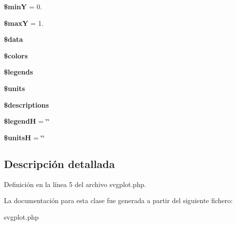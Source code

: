 \begin{DoxyCompactItemize}
\item 
\hypertarget{classSVGplot_a1cf6d7665187cdcff7721f4a41b2590d}{{\bfseries \$min\-Y} = 0.}\label{classSVGplot_a1cf6d7665187cdcff7721f4a41b2590d}

\item 
\hypertarget{classSVGplot_a3e917ac1e30762bb7fc99ed715a36ab7}{{\bfseries \$max\-Y} = 1.}\label{classSVGplot_a3e917ac1e30762bb7fc99ed715a36ab7}

\item 
\hypertarget{classSVGplot_ae31b72045889d0bf812ae835f836cdd8}{{\bfseries \$data}}\label{classSVGplot_ae31b72045889d0bf812ae835f836cdd8}

\item 
\hypertarget{classSVGplot_a8dbfedecb97d3c82c30a2b43d4b57c79}{{\bfseries \$colors}}\label{classSVGplot_a8dbfedecb97d3c82c30a2b43d4b57c79}

\item 
\hypertarget{classSVGplot_a8893ea8511edcdad8a90cace54db09b1}{{\bfseries \$legends}}\label{classSVGplot_a8893ea8511edcdad8a90cace54db09b1}

\item 
\hypertarget{classSVGplot_a8d000e306c896835b1e8aab693e1772a}{{\bfseries \$units}}\label{classSVGplot_a8d000e306c896835b1e8aab693e1772a}

\item 
\hypertarget{classSVGplot_a60a60e1c751277eb8db37bf9fdc60c79}{{\bfseries \$descriptions}}\label{classSVGplot_a60a60e1c751277eb8db37bf9fdc60c79}

\item 
\hypertarget{classSVGplot_aef827b465ef1dbc6c2e3dd72496eba7e}{{\bfseries \$legend\-H} = \char`\"{}\char`\"{}}\label{classSVGplot_aef827b465ef1dbc6c2e3dd72496eba7e}

\item 
\hypertarget{classSVGplot_a03724d0202bd3c8a1ee866deea738377}{{\bfseries \$units\-H} = \char`\"{}\char`\"{}}\label{classSVGplot_a03724d0202bd3c8a1ee866deea738377}

\end{DoxyCompactItemize}


\subsection{\-Descripción detallada}


\-Definición en la línea 5 del archivo svgplot.\-php.



\-La documentación para esta clase fue generada a partir del siguiente fichero\-:\begin{DoxyCompactItemize}
\item 
svgplot.\-php\end{DoxyCompactItemize}

